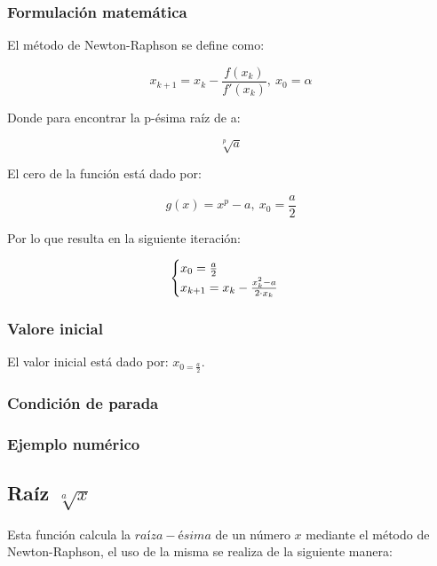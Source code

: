 \documentclass[10pt,a4paper]{article}
\begin{document}
	\subsubsection{Formulación matemática}
	
	El método de Newton-Raphson se define como:
	
	\begin{equation}\label{key19}
		x_{k+1} = x_{k} - \frac{f(x_{k})}{f'(x_{k})}, ~x_{0} = \alpha
	\end{equation}
	
	Donde para encontrar la p-ésima raíz de a:
	
	\begin{equation}\label{key20}
		\sqrt[p]{a}	
	\end{equation}

	El cero de la función está dado por:
	
	\begin{equation}\label{key21}
		g(x) = x^{p} - a, ~x_{0} = \frac{a}{2}
	\end{equation}

	Por lo que resulta en la siguiente iteración:
	
	\begin{align*}
		\centering
		\begin{cases}
			x_{0} = \frac{a}{2} \\
			x_{k+1} = x_{k} - \frac{x_{k}^{2} - a}{2\cdot x_{k}}
		\end{cases}
	\end{align*}
	
	
	\subsubsection{Valore inicial}
	El valor inicial está dado por: $x_{0 = \frac{a}{2}}$.
	\subsubsection{Condición de parada}
	
	\subsubsection{Ejemplo numérico}
	
	\subsection{Raíz $\sqrt[a]{x}$}
	
	Esta función calcula la $raíz a-ésima$ de un número $x$ mediante el método de Newton-Raphson, el uso de la misma se realiza de la siguiente manera:
	
\end{document}

